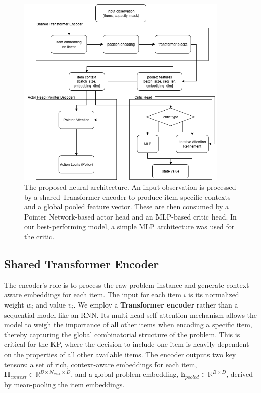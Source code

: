 \begin{figure}[H]
    \centering
    \includegraphics[width=0.9\textwidth]{figures/ppo_model_manual.png}
    \caption{The proposed neural architecture. An input observation is processed by a shared Transformer encoder to produce item-specific contexts and a global pooled feature vector. These are then consumed by a Pointer Network-based actor head and an MLP-based critic head. In our best-performing model, a simple MLP architecture was used for the critic.}
    \label{fig:model_architecture}
\end{figure}

\subsection{Shared Transformer Encoder}
The encoder's role is to process the raw problem instance and generate context-aware embeddings for each item. The input for each item \(i\) is its normalized weight \(w_i\) and value \(v_i\). We employ a \textbf{Transformer encoder} rather than a sequential model like an RNN. Its multi-head self-attention mechanism allows the model to weigh the importance of all other items when encoding a specific item, thereby capturing the global combinatorial structure of the problem. This is critical for the KP, where the decision to include one item is heavily dependent on the properties of all other available items. The encoder outputs two key tensors: a set of rich, context-aware embeddings for each item, \(\mathbf{H}_{context} \in \mathbb{R}^{B \times N_{max} \times D}\), and a global problem embedding, \(\mathbf{h}_{pooled} \in \mathbb{R}^{B \times D}\), derived by mean-pooling the item embeddings.


